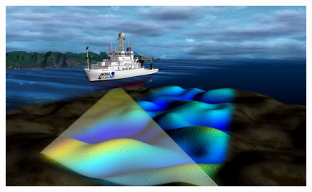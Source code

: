 \begin{minipage}{.5\textwidth}
\begin{figure}[H]
\begin{center}
\includegraphics[width=.8\textwidth]{../Grade10/photos/sonar_NOAANationalOceanService_flickr.jpg}
% 

\end{center}
\end{figure}
\end{minipage}
